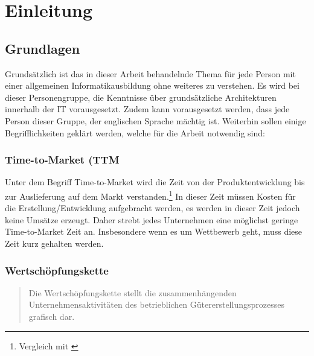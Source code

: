 \chapter{Einleitung}
\label{chap:einleitung}

\section{Grundlagen}
\label{sec:Grundlagen}
Grundsätzlich ist das in dieser Arbeit behandelnde Thema für jede Person mit einer allgemeinen Informatikausbildung ohne weiteres zu verstehen. Es wird bei dieser Personengruppe, die Kenntnisse über grundsätzliche Architekturen innerhalb der IT vorausgesetzt. Zudem kann vorausgesetzt werden, dass jede Person dieser Gruppe, der englischen Sprache mächtig ist. Weiterhin sollen  einige Begrifflichkeiten geklärt werden, welche für die Arbeit notwendig sind:

\subsection{Time-to-Market (TTM}
\label{subsec:ttm}
Unter dem Begriff Time-to-Market wird die Zeit von der Produktentwicklung bis zur Auslieferung auf dem Markt verstanden.\footnote{Vergleich mit \cite{ttm:BusinessDictionary}}  In dieser Zeit müssen Kosten für die Erstellung/Entwicklung aufgebracht werden, es werden in dieser Zeit jedoch keine Umsätze erzeugt. Daher strebt jedes Unternehmen eine möglichst geringe Time-to-Market Zeit an. Insbesondere wenn es um Wettbewerb geht, muss diese Zeit kurz gehalten werden.

\subsection{Wertschöpfungskette}
\label{subsec:Wertschoepfungskette}
\begin{quotation}
\frqq Die Wertschöpfungskette stellt die zusammenhängenden Unternehmensaktivitäten des betrieblichen Gütererstellungsprozesses grafisch dar.\flqq \cite{gabler}
\end{quotation}

